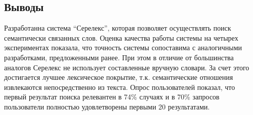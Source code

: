 \documentclass[a4paper,10pt,twoside]{article}
\begin{document}
\subsection{Выводы}

Разработанна система "`Серелекс"', которая позволяет осуществлять поиск семантически связанных слов. Оценка качества работы системы на четырех экспериментах показала, что точность системы сопоставима с аналогичными разработками, предложенными ранее. При этом в отличие от большинства аналогов Серелекс не использует составленные вручную словари. За счет этого достигается лучшее лексическое покрытие, т.к. семантические отношения извлекаются непосредственно из текста. Опрос пользователей показал, что первый результат поиска релевантен в 74\% случаях и в 70\% запросов пользователи полностью удовлетворены первыми 20 результатами.   



\end{document}
